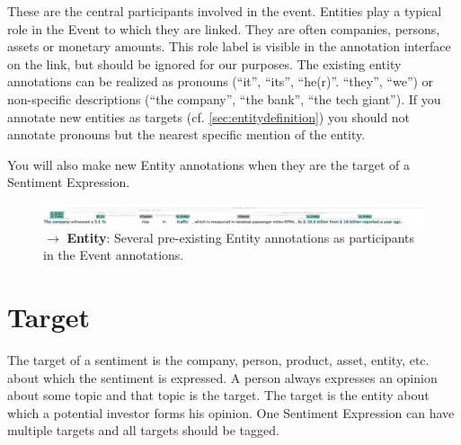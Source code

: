 These are the central participants involved in the event.
Entities play a typical role in the Event to which they are linked.
They are often companies, persons, assets or monetary amounts.
This role label is visible in the annotation interface on the link, but should be ignored for our purposes.
The existing entity annotations can be realized as pronouns (``it'', ``its'', ``he(r)''. ``they'', ``we'') or non-specific descriptions (``the company'', ``the bank'', ``the tech giant'').
If you annotate new entities as targets (cf. \ref{sec:entitydefinition}) you should not annotate pronouns but the nearest specific mention of the entity.

You will also make new Entity annotations when they are the target of a Sentiment Expression.

\begin{figure}[h]
    \centering
    \includegraphics[width=\textwidth]{img/aal00s03 entities example.png}
    \caption*{$\rightarrow$ \textbf{Entity}: Several \entitycolor pre-existing Entity annotations as participants in the Event annotations.}
    \label{fig:ent_ex1}
\end{figure}

\section{Target}
\label{sec:targetdefinition}
The target of a sentiment is the company, person, product, asset, entity, etc. about which the sentiment is expressed.
A person always expresses an opinion about some topic and that topic is the target.
The target is the entity about which a potential investor forms his opinion.
One Sentiment Expression can have multiple targets and all targets should be tagged.

